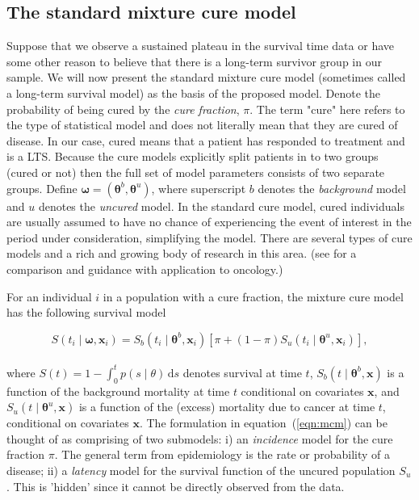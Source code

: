 \documentclass[AMA,STIX1COL]{WileyNJD-v2}
\begin{document}
\subsection{The standard mixture cure model} \label{section:basic_model}
Suppose that we observe a sustained plateau in the survival time data or have some other reason to believe that there is a long-term survivor group in our sample. We will now present the standard mixture cure model (sometimes called a long-term survival model) as the basis of the proposed model.
Denote the probability of being cured by the {\it cure fraction}, $\pi$.
The term "cure" here refers to the type of statistical model and does not literally mean that they are cured of disease. In our case, cured means that a patient has responded to treatment and is a LTS.
Because the cure models explicitly split patients in to two groups (cured or not) then the full set of model parameters consists of two separate groups.
Define $\bm\omega = (\bm\theta^b, \bm\theta^u)$, where superscript $b$ denotes the \textit{background} model and $u$ denotes the \textit{uncured} model.
In the standard cure model, cured individuals are usually assumed to have no chance of experiencing the event of interest in the period under consideration, simplifying the model.
There are several types of cure models and a rich and growing body of research in this area.
(see \citep{Yu2013} for a comparison and guidance with application to oncology.)


For an individual $i$ in a population with a cure fraction, the mixture cure model has the following survival model

\begin{equation}
\label{eqn:mcm}
S(t_{i} \mid \bm\omega, \bm{x}_i) = S_b(t_{i} \mid \bm\theta^b, \bm{x}_{i}) \left[\pi + (1 - \pi) S_u(t_{i} \mid \bm\theta^u, \bm{x}_{i}) \right],
\end{equation}
\\
\noindent
where $S(t) = 1 \!-\! \int_0^t p(s \mid \theta)\, \text{d}s$ denotes survival at time $t$,
$S_b(t \mid \bm\theta^b, \bm{x})$ is a function of the background mortality at time $t$ conditional on covariates $\bm{x}$,
and $S_u(t \mid \bm\theta^u, \bm{x})$ is a function of the (excess) mortality due to cancer at time $t$, conditional on covariates $\bm{x}$.
The formulation in equation~(\ref{eqn:mcm}) can be thought of as comprising of two submodels: i) an \textit{incidence} model for the cure fraction $\pi$. The general term from epidemiology is the rate or probability of a disease; ii) a \textit{latency} model for the survival function of the uncured population $S_u$. This is 'hidden' since it cannot be directly observed from the data.
\end{document}
